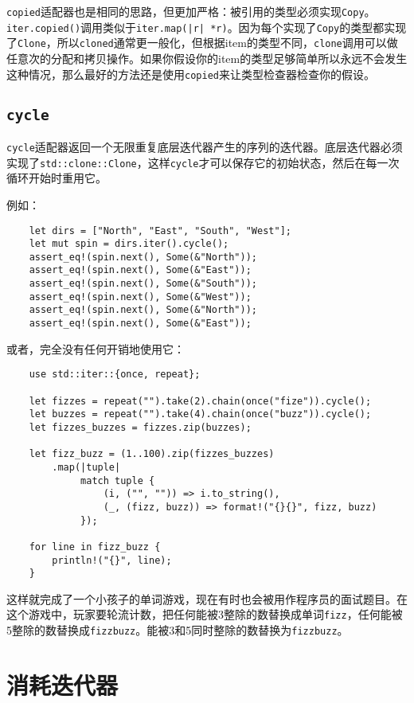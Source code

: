 \texttt{copied}适配器也是相同的思路，但更加严格：被引用的类型必须实现\texttt{Copy}。\\
\texttt{iter.copied()}调用类似于\texttt{iter.map(|r| *r)}。因为每个实现了\texttt{Copy}的类型都实现了\texttt{Clone}，所以\texttt{cloned}通常更一般化，但根据item的类型不同，\texttt{clone}调用可以做任意次的分配和拷贝操作。如果你假设你的item的类型足够简单所以永远不会发生这种情况，那么最好的方法还是使用\texttt{copied}来让类型检查器检查你的假设。

\subsection{\texttt{cycle}}
\texttt{cycle}适配器返回一个无限重复底层迭代器产生的序列的迭代器。底层迭代器必须实现了\texttt{std::clone::Clone}，这样\texttt{cycle}才可以保存它的初始状态，然后在每一次循环开始时重用它。

例如：
\begin{verbatim}
    let dirs = ["North", "East", "South", "West"];
    let mut spin = dirs.iter().cycle();
    assert_eq!(spin.next(), Some(&"North"));
    assert_eq!(spin.next(), Some(&"East"));
    assert_eq!(spin.next(), Some(&"South"));
    assert_eq!(spin.next(), Some(&"West"));
    assert_eq!(spin.next(), Some(&"North"));
    assert_eq!(spin.next(), Some(&"East"));
\end{verbatim}

或者，完全没有任何开销地使用它：
\begin{verbatim}
    use std::iter::{once, repeat};

    let fizzes = repeat("").take(2).chain(once("fize")).cycle();
    let buzzes = repeat("").take(4).chain(once("buzz")).cycle();
    let fizzes_buzzes = fizzes.zip(buzzes);

    let fizz_buzz = (1..100).zip(fizzes_buzzes)
        .map(|tuple|
             match tuple {
                 (i, ("", "")) => i.to_string(),
                 (_, (fizz, buzz)) => format!("{}{}", fizz, buzz)
             });
    
    for line in fizz_buzz {
        println!("{}", line);
    }
\end{verbatim}

这样就完成了一个小孩子的单词游戏，现在有时也会被用作程序员的面试题目。在这个游戏中，玩家要轮流计数，把任何能被3整除的数替换成单词\texttt{fizz}，任何能被5整除的数替换成\texttt{fizzbuzz}。能被3和5同时整除的数替换为\texttt{fizzbuzz}。

\section{消耗迭代器}

